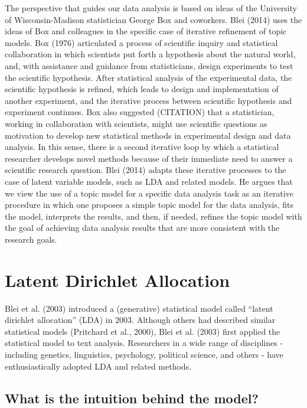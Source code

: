 \documentclass[12pt,]{article}
\begin{document}
The perspective that guides our data analysis is based on ideas of the
University of Wisconsin-Madison statistician George Box and coworkers.
Blei (2014) uses the ideas of Box and colleagues in the specific case of
iterative refinement of topic models. Box (1976) articulated a process
of scientific inquiry and statistical collaboration in which scientists
put forth a hypothesis about the natural world, and, with assistance and
guidance from statisticians, design experiments to test the scientific
hypothesis. After statistical analysis of the experimental data, the
scientific hypothesis is refined, which leads to design and
implementation of another experiment, and the iterative process between
scientific hypothesis and experiment continues. Box also suggested
(CITATION) that a statistician, working in collaboration with
scientists, might use scientific questions as motivation to develop new
statistical methods in experimental design and data analysis. In this
sense, there is a second iterative loop by which a statistical
researcher develops novel methods because of their immediate need to
answer a scientific research question. Blei (2014) adapts these
iterative processes to the case of latent variable models, such as LDA
and related models. He argues that we view the use of a topic model for
a specific data analysis task as an iterative procedure in which one
proposes a simple topic model for the data analysis, fits the model,
interprets the results, and then, if needed, refines the topic model
with the goal of achieving data analysis results that are more
consistent with the research goals.

\section{Latent Dirichlet Allocation}\label{latent-dirichlet-allocation}

Blei et al. (2003) introduced a (generative) statistical model called
``latent dirichlet allocation'' (LDA) in 2003. Although others had
described similar statistical models (Pritchard et al., 2000), Blei et
al. (2003) first applied the statistical model to text analysis.
Researchers in a wide range of disciplines - including genetics,
linguistics, psychology, political science, and others - have
enthusiastically adopted LDA and related methods.

\subsection{What is the intuition behind the
model?}\label{what-is-the-intuition-behind-the-model}
\end{document}
